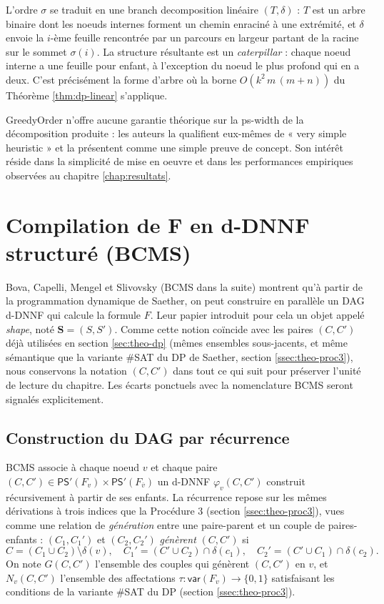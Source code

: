 \documentclass[11pt,a4paper]{report}
\theoremstyle{plain}
\theoremstyle{definition}
\begin{document}
L'ordre $\sigma$ se traduit en une branch decomposition linéaire
$(T, \delta)$ : $T$ est un arbre binaire dont les noeuds internes
forment un chemin enraciné à une extrémité, et $\delta$ envoie la
$i$-ème feuille rencontrée par un parcours en largeur partant de la
racine sur le sommet $\sigma(i)$. La structure résultante est un
\emph{caterpillar} : chaque noeud interne a une feuille pour enfant, à
l'exception du noeud le plus profond qui en a deux. C'est précisément
la forme d'arbre où la borne $O(k^2\, m\, (m+n))$ du
Théorème \ref{thm:dp-linear} s'applique.

GreedyOrder n'offre aucune garantie théorique sur la ps-width de la
décomposition produite : les auteurs la qualifient eux-mêmes de
« very simple heuristic » et la présentent comme une simple preuve de
concept. Son intérêt réside dans la simplicité de mise en oeuvre et dans
les performances empiriques observées au chapitre \ref{chap:resultats}.

\section{Compilation de F en d-DNNF structuré (BCMS)}
\label{sec:theo-bcms}

Bova, Capelli, Mengel et Slivovsky \cite{bova2015} (BCMS dans la suite)
montrent qu'à partir de la programmation dynamique de Saether, on peut
construire en parallèle un DAG d-DNNF qui calcule la formule $F$. Leur
papier introduit pour cela un objet appelé \emph{shape}, noté
$\mathbf{S} = (S, S')$. Comme cette notion coïncide avec les paires
$(C, C')$ déjà utilisées en section \ref{sec:theo-dp} (mêmes ensembles
sous-jacents, et même sémantique que la variante \#SAT du DP de
Saether, section \ref{ssec:theo-proc3}), nous conservons la notation
$(C, C')$ dans tout ce qui suit pour préserver l'unité de lecture du
chapitre. Les écarts ponctuels avec la nomenclature BCMS seront
signalés explicitement.

\subsection{Construction du DAG par récurrence}
\label{ssec:theo-bcms-construction}

BCMS associe à chaque noeud $v$ et chaque paire $(C, C') \in
\mathsf{PS}'(F_v) \times \mathsf{PS}'(F_{\overline{v}})$ un d-DNNF
$\varphi_v(C, C')$ construit récursivement à partir de ses enfants. La
récurrence repose sur les mêmes dérivations à trois indices que la
Procédure 3 (section \ref{ssec:theo-proc3}), vues comme une relation
de \emph{génération} entre une paire-parent et un couple de
paires-enfants : $(C_1, C_1')$ et $(C_2, C_2')$ \emph{génèrent}
$(C, C')$ si
\[
  C = (C_1 \cup C_2) \setminus \delta(v),
  \quad
  C_1' = (C' \cup C_2) \cap \delta(c_1),
  \quad
  C_2' = (C' \cup C_1) \cap \delta(c_2).
\]
On note $G(C, C')$ l'ensemble des couples qui génèrent $(C, C')$ en
$v$, et $N_v(C, C')$ l'ensemble des affectations
$\tau : \mathsf{var}(F_v) \to \{0, 1\}$ satisfaisant les conditions de
la variante \#SAT du DP (section \ref{ssec:theo-proc3}).
\end{document}

